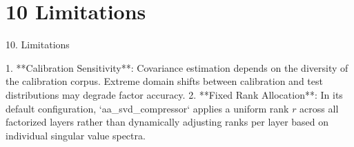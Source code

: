 \section{10 Limitations}

 10. Limitations

1. **Calibration Sensitivity**: Covariance estimation depends on the diversity of the calibration corpus. Extreme domain shifts between calibration and test distributions may degrade factor accuracy.
2. **Fixed Rank Allocation**: In its default configuration, `aa\_svd\_compressor` applies a uniform rank $r$ across all factorized layers rather than dynamically adjusting ranks per layer based on individual singular value spectra.
